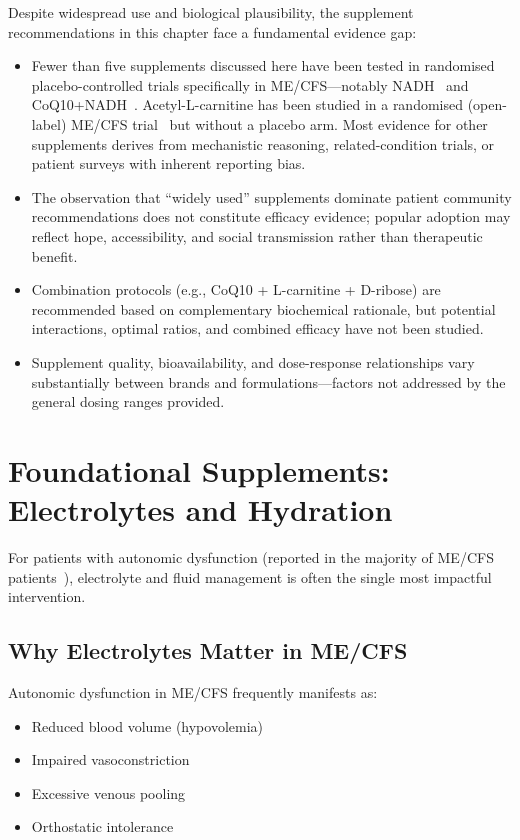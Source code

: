 \begin{limitation}
Despite widespread use and biological plausibility, the supplement recommendations in this chapter face a fundamental evidence gap:
\begin{itemize}
    \item Fewer than five supplements discussed here have been tested in randomised placebo-controlled trials specifically in ME/CFS---notably NADH~\cite{Forsyth1999NADH} and CoQ10+NADH~\cite{CastroMarrero2021fatigue}. Acetyl-L-carnitine has been studied in a randomised (open-label) ME/CFS trial~\cite{Vermeulen2004carnitine} but without a placebo arm. Most evidence for other supplements derives from mechanistic reasoning, related-condition trials, or patient surveys with inherent reporting bias.
    \item The observation that ``widely used'' supplements dominate patient community recommendations does not constitute efficacy evidence; popular adoption may reflect hope, accessibility, and social transmission rather than therapeutic benefit.
    \item Combination protocols (e.g., CoQ10 + L-carnitine + D-ribose) are recommended based on complementary biochemical rationale, but potential interactions, optimal ratios, and combined efficacy have not been studied.
    \item Supplement quality, bioavailability, and dose-response relationships vary substantially between brands and formulations---factors not addressed by the general dosing ranges provided.
\end{itemize}
\end{limitation}

\section{Foundational Supplements: Electrolytes and Hydration}
\label{sec:electrolytes}

For patients with autonomic dysfunction (reported in the majority of ME/CFS patients~\cite{Newton2007autonomicDysfunction}), electrolyte and fluid management is often the single most impactful intervention.

\subsection{Why Electrolytes Matter in ME/CFS}

Autonomic dysfunction in ME/CFS frequently manifests as:
\begin{itemize}
    \item Reduced blood volume (hypovolemia)
    \item Impaired vasoconstriction
    \item Excessive venous pooling
    \item Orthostatic intolerance
\end{itemize}

